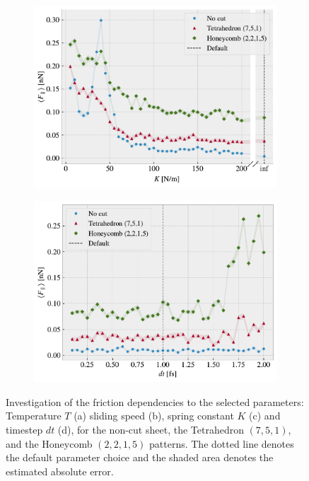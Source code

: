 \begin{figure}[!htb]
\begin{subfigure}[t]{0.49\textwidth}
      \centering
      \includegraphics[width=\textwidth]{figures/baseline/variables_spring_mean_fixmove.pdf}
      \caption{}
      \label{fig:var_K}
    \end{subfigure}
    \hfill
    \begin{subfigure}[t]{0.49\textwidth}
        \centering
        \includegraphics[width=\textwidth]{figures/baseline/variables_dt_mean_fixmove.pdf}
        \caption{}
        \label{fig:var_dt}
    \end{subfigure}
    \hfill
    \caption{Investigation of the friction dependencies to the selected parameters: Temperature $T$ (a) sliding speed (b), spring constant $K$ (c) and timestep $dt$ (d), for the non-cut sheet, the Tetrahedron $(7,5,1)$, and the Honeycomb $(2,2,1,5)$ patterns. The dotted line denotes the default parameter choice and the shaded area denotes the estimated absolute error.}
    \label{fig:main_param}
\end{figure}

